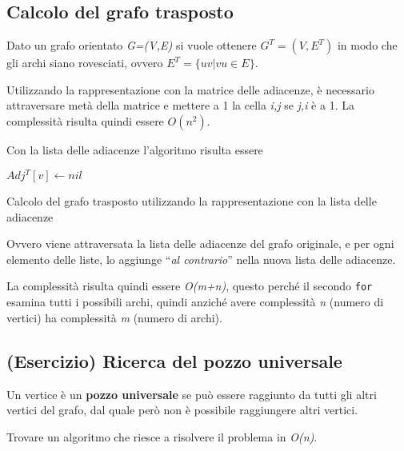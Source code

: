 \subsection{Calcolo del grafo trasposto}\label{calcolo-del-grafo-trasposto}

Dato un grafo orientato \emph{G=(V,E)} si vuole ottenere $ G^T = (V, E^T)$ in modo che gli archi siano rovesciati, ovvero $E^T = \{uv | vu \in E\}$.

Utilizzando la rappresentazione con la matrice delle adiacenze, è
necessario attraversare metà della matrice e mettere a 1 la cella
\emph{i,j} se \emph{j,i} è a 1. La complessità risulta quindi essere
$O(n^2)$.

Con la lista delle adiacenze l'algoritmo risulta essere


\begin{algorithm}
	\begin{algorithmic}
				\State $Adj^T[v] \gets nil$
			\EndFor
				\EndWhile
			\EndFor
		\EndFunction
	\end{algorithmic}
	\caption{Calcolo del grafo trasposto utilizzando la rappresentazione con la lista delle adiacenze}
\end{algorithm}

Ovvero viene attraversata la lista delle adiacenze del grafo originale,
e per ogni elemento delle liste, lo aggiunge ``\emph{al contrario}''
nella nuova lista delle adiacenze.

La complessità risulta quindi essere \emph{O(m+n)}, questo perché il
secondo \texttt{for} esamina tutti i possibili archi, quindi anziché
avere complessità \emph{n} (numero di vertici) ha complessità \emph{m}
(numero di archi).

\subsection{(Esercizio) Ricerca del pozzo
universale}\label{esericizio-ricerca-del-pozzo-universale}

Un vertice è un \textbf{pozzo universale} se può essere raggiunto da
tutti gli altri vertici del grafo, dal quale però non è possibile
raggiungere altri vertici.

Trovare un algoritmo che riesce a risolvere il problema in \emph{O(n)}.
